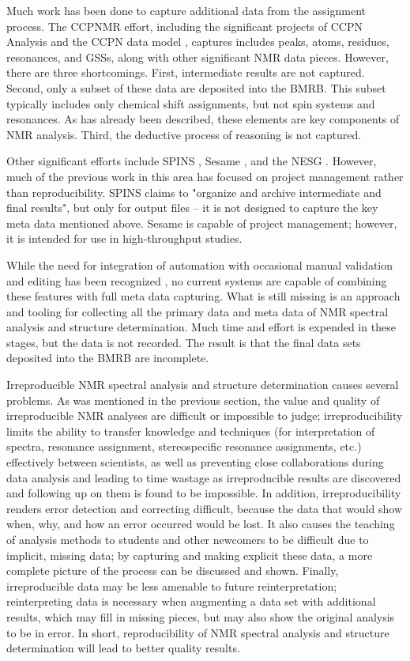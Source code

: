 Much work has been done to capture additional data from the assignment process.  
The CCPNMR effort, including the significant projects of CCPN Analysis and the 
CCPN data model \cite{ccpn}, captures includes peaks, atoms, residues, 
resonances, and GSSs, along with other significant NMR data pieces.  
However, there are three shortcomings.  First, intermediate results are not 
captured.  Second, only a subset of these data are deposited into the BMRB.  
This subset typically includes only chemical shift assignments, but not spin 
systems and resonances.   As has already been described, these elements are 
key components of NMR analysis.  Third, the deductive process of reasoning 
is not captured.

Other significant efforts include SPINS \cite{baran2006spins}, 
Sesame \cite{sesame}, and 
the NESG \cite{nesg2005nmr}.  However, much of the previous 
work in this area has focused on project management rather than reproducibility.
SPINS claims to "organize and archive intermediate and final results", but 
only for output files -- it is not designed to capture the key meta data
mentioned above.  Sesame is capable of project management; however, it is 
intended for use in high-throughput studies.  

While the need for integration of automation with occasional manual 
validation and editing has been recognized \cite{baran2006spins}, no 
current systems are capable of combining these features with full 
meta data capturing.  
What is still missing is an approach and tooling for collecting all the primary 
data and meta data of NMR spectral analysis and structure determination.  Much 
time and effort is expended in these stages, but the data is not recorded.  The 
result is that the final data sets deposited into the BMRB are incomplete.

Irreproducible NMR spectral analysis and structure determination causes 
several problems.  As was mentioned in the previous section, the value and 
quality of irreproducible NMR analyses are difficult or impossible to judge; 
irreproducibility limits the ability to transfer knowledge and techniques 
(for interpretation of spectra, resonance assignment, stereospecific resonance 
assignments, etc.) effectively between scientists, as well as preventing close 
collaborations during data analysis and leading to time wastage as 
irreproducible results are discovered and following up on them is found to be 
impossible.  In addition, irreproducibility renders error detection and 
correcting difficult, because the data that would show when, why, and how an 
error occurred would be lost.  It also causes the teaching of analysis methods 
to students and other newcomers to be difficult due to implicit, missing data; 
by capturing and making explicit these data, a more complete picture of the 
process can be discussed and shown.  Finally, irreproducible data may be less 
amenable to future reinterpretation; reinterpreting data is necessary when 
augmenting a data set with additional results, which may fill in missing 
pieces, but may also show the original analysis to be in error.  In short, 
reproducibility of NMR spectral analysis and structure determination will lead 
to better quality results.


